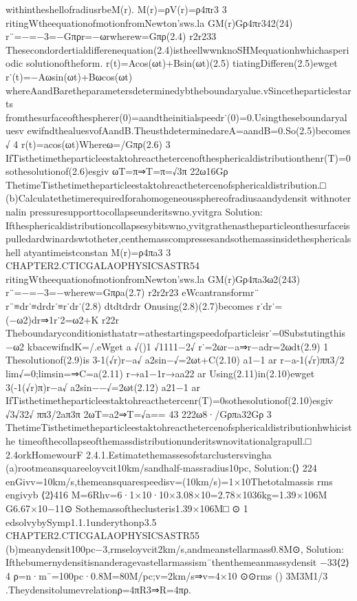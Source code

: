 withintheshellofradiusrbeM(r).
M(r)=ρV(r)=ρ4πr3
3
ritingWtheequationofmotionfromNewton’sws.la
GM(r)Gρ4πr342(24)
r¨=−=−3=−Gπρr=−ωrwherew=Gπρ(2.4)
r2r233
Thesecondordertialdifferenequation(2.4)istheellwwnknoSHMequationhwhichasperiodic
solutionoftheform.
r(t)=Acos(ωt)+Bsin(ωt)(2.5)
tiatingDifferen(2.5)ewget
r˙(t)=−Aωsin(ωt)+Bωcos(ωt)
whereAandBaretheparametersdeterminedybtheboundaryalue.vSincetheparticlestarts
fromthesurfaceofthespherer(0)=aandtheinitialspeedr˙(0)=0.Usingtheseboundaryaluesv
ewifndthealuesvofAandB.TheusthdeterminedareA=aandB=0.So(2.5)becomes
√
4
r(t)=acos(ωt)Whereω=/Gπρ(2.6)
3
IfTisthetimetheparticleestaktohreacthetercenofthesphericaldistributionthenr(T)=0
sothesolutionof(2.6)esgiv
ωT=π⇒T=π=√3π
22ω16Gρ
ThetimeTisthetimetheparticleestaktohreacthetercenofsphericaldistribution.□
(b)Calculatethetimerequiredforahomogeneoussphereofradiusaandydensit￿withnoternalin
pressuresupporttocollapseunderitswno.yvitgra
Solution:
Ifthesphericaldistributioncollapsesybitswno,yvitgrathenastheparticleonthesurfaceis
pulledardwinardswtotheter,centhemasscompressesandsothemassinsidethesphericalshell
atyantimeistconstan
M(r)=ρ4πa3
3
CHAPTER2.CTICGALAOPHYSICSASTR54
ritingWtheequationofmotionfromNewton’sws.la
GM(r)Gρ4πa3ω2(243)
r¨=−=−3=−wherew=Gπρa(2.7)
r2r2r23
eWcantransformr¨
r¨≡dr˙≡drdr˙≡r˙dr˙(2.8)
dtdtdrdr
Onusing(2.8)(2.7)becomes
r˙dr˙=(−ω2)dr⇒1r˙2=ω2+K
r22r
Theboundaryconditionisthatatr=athestartingspeedofparticleisr˙=0Substutingthis
−ω2
kbacewifndK=/.eWget
a
√()1
√1111−2√
r˙=2ωr−a⇒r−adr=2ωdt(2.9)
1
Thesolutionof(2.9)is
3-1(√r)r−a√
a2sin−√=2ωt+C(2.10)
a1−1
ar
r−a-1(√r)ππ3/2
lim√=0;limsin=⇒C=a(2.11)
r→a1−1r→aa22
ar
Using(2.11)in(2.10)ewget
3(-1(√r)π)r−a√
a2sin−−√=2ωt(2.12)
a21−1
ar
IfTisthetimetheparticleestaktohreacthetercenr(T)=0sothesolutionof(2.10)esgiv
√3√32√
ππ3/2aπ3π
2ωT=a2⇒T=√a==
43
222ω8·/Gρπa32Gρ
3
ThetimeTisthetimetheparticleestaktohreacthetercenofsphericaldistributionhwhicisthe
timeofthecollapseofthemassdistributionunderitswnovitationalgrapull.□
2.4orkHomewourF
2.4.1.Estimatethemassesofstarclustersvingha
(a)rootmeansquareeloyvcit10km/sandhalf-massradius10pc,
Solution:⟨⟩
224
enGivv=10km/s,themeansquarespeedisv=(10km/s)=1×10Thetotalmassis
rms
engivyb
⟨2⟩416
M=6Rhv=6·1×10·10×3.08×10=2.78×1036kg=1.39×106M
G6.67×10−11⊙
Sothemassoftheclusteris1.39×106M□
⊙
1
edsolvybySymp1.1.1underythonp3.5
CHAPTER2.CTICGALAOPHYSICSASTR55
(b)meanydensit100pc−3,rmseloyvcit2km/s,andmeanstellarmass0.8M⊙,
Solution:
Ifthebumernydensitisnanderagevastellarmassism¯thenthemeanmassydensit
−33⟨2⟩4
ρ=n·m¯=100pc·0.8M=80M/pc;v=2km/s⇒v=4×10
⊙⊙rms
()
3M3M1/3
.Theydensitolumevrelationρ=4πR3⇒R=4πρ.
